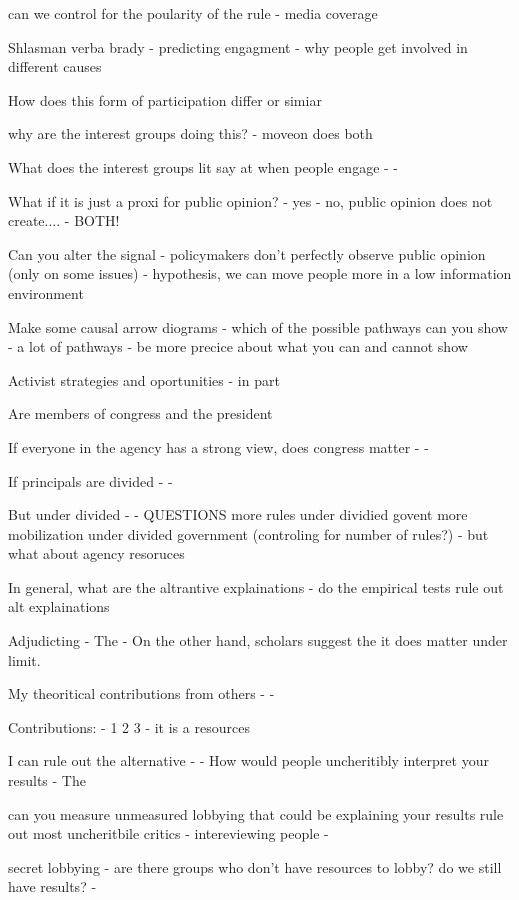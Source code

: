 can we control for the poularity of the rule 
- media coverage

Shlasman verba brady 
- predicting engagment 
- why people get involved in different causes 

How does this form of participation differ or simiar

why are the interest groups doing this? 
- moveon does both 

What does the interest groups lit say at when people engage 
- 
- 

What if it is just a proxi for public opinion? 
- yes
- no, public opinion does not create....
- BOTH! 

Can you alter the signal
- policymakers don't perfectly observe public opinion (only on some issues) 
- hypothesis, we can move people more in a low information environment


Make some causal arrow diograms 
- which of the possible pathways can you show 
- a lot of pathways 
- be more precice about what you can and cannot show


Activist strategies and oportunities 
- in part 


Are members of congress and the president 

If everyone in the agency has a strong view, does congress matter 
- 
- 

If principals are divided
- 
- 

But under divided
- 
- 
QUESTIONS 
more rules under dividied govent
more mobilization under divided government (controling for number of rules?) 
- but what about agency resoruces 

In general, what are the altrantive explainations 
- do the empirical tests rule out alt explainations 




Adjudicting 
- The  
- 
On the other hand, scholars suggest the it does matter under limit.

My theoritical contributions from others 
- 
- 

Contributions: 
- 1 2 3 
- it is a resources 

I can rule out the alternative 
- 
- 
How would people uncheritibly interpret your results 
- The

can you measure unmeasured lobbying that could be explaining your results 
rule out most uncheritbile critics 
- intereviewing people 
- 

secret lobbying 
- are there groups who don't have resources to lobby? do we still have results? 
- 

